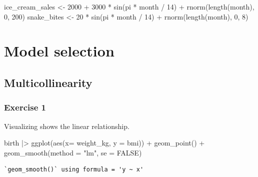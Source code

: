 \documentclass[
  letterpaper,
  DIV=11,
  numbers=noendperiod]{scrreprt}
\newenvironment{Shaded}{\begin{snugshade}}{\end{snugshade}}
\newcommand{\AttributeTok}[1]{\textcolor[rgb]{0.40,0.45,0.13}{#1}}
\newcommand{\ConstantTok}[1]{\textcolor[rgb]{0.56,0.35,0.01}{#1}}
\newcommand{\DecValTok}[1]{\textcolor[rgb]{0.68,0.00,0.00}{#1}}
\newcommand{\FunctionTok}[1]{\textcolor[rgb]{0.28,0.35,0.67}{#1}}
\newcommand{\NormalTok}[1]{\textcolor[rgb]{0.00,0.23,0.31}{#1}}
\newcommand{\OtherTok}[1]{\textcolor[rgb]{0.00,0.23,0.31}{#1}}
\newcommand{\SpecialCharTok}[1]{\textcolor[rgb]{0.37,0.37,0.37}{#1}}
\newcommand{\StringTok}[1]{\textcolor[rgb]{0.13,0.47,0.30}{#1}}
\begin{document}
\begin{Shaded}
\begin{Highlighting}[]
\NormalTok{ice\_cream\_sales }\OtherTok{\textless{}{-}} \DecValTok{2000} \SpecialCharTok{+} \DecValTok{3000} \SpecialCharTok{*} \FunctionTok{sin}\NormalTok{(pi }\SpecialCharTok{*}\NormalTok{ month }\SpecialCharTok{/} \DecValTok{14}\NormalTok{) }\SpecialCharTok{+} \FunctionTok{rnorm}\NormalTok{(}\FunctionTok{length}\NormalTok{(month), }\DecValTok{0}\NormalTok{, }\DecValTok{200}\NormalTok{)}
\NormalTok{snake\_bites }\OtherTok{\textless{}{-}} \DecValTok{20} \SpecialCharTok{*} \FunctionTok{sin}\NormalTok{(pi }\SpecialCharTok{*}\NormalTok{ month }\SpecialCharTok{/} \DecValTok{14}\NormalTok{) }\SpecialCharTok{+} \FunctionTok{rnorm}\NormalTok{(}\FunctionTok{length}\NormalTok{(month), }\DecValTok{0}\NormalTok{, }\DecValTok{8}\NormalTok{)}
\end{Highlighting}
\end{Shaded}

\section{Model selection}\label{model-selection-2}

\subsection{Multicollinearity}\label{multicollinearity-1}

\subsubsection{Exercise 1}\label{exercise-1-28}

Visualizing shows the linear relationship.

\begin{Shaded}
\begin{Highlighting}[]
\NormalTok{birth }\SpecialCharTok{|\textgreater{}} 
  \FunctionTok{ggplot}\NormalTok{(}\FunctionTok{aes}\NormalTok{(}\AttributeTok{x=}\NormalTok{ weight\_kg, }\AttributeTok{y =}\NormalTok{ bmi)) }\SpecialCharTok{+} 
  \FunctionTok{geom\_point}\NormalTok{() }\SpecialCharTok{+}
  \FunctionTok{geom\_smooth}\NormalTok{(}\AttributeTok{method =} \StringTok{"lm"}\NormalTok{, }\AttributeTok{se =} \ConstantTok{FALSE}\NormalTok{)}
\end{Highlighting}
\end{Shaded}

\begin{verbatim}
`geom_smooth()` using formula = 'y ~ x'
\end{verbatim}
\end{document}
